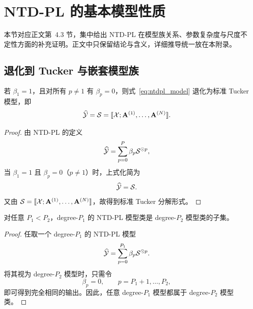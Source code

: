 \appendix


\section{NTD-PL 的基本模型性质}
\label{app:model_properties}

本节对应正文第~4.3 节，集中给出 NTD-PL 在模型族关系、参数复杂度与尺度不定性方面的补充证明。正文中只保留结论与含义，详细推导统一放在本附录。

\subsection{退化到 Tucker 与嵌套模型族}

\begin{proposition}
\label{prop:tucker_special_case_app}
若 $\beta_1=1$，且对所有 $p\neq 1$ 有 $\beta_p=0$，则式~\eqref{eq:ntdpl_model} 退化为标准 Tucker 模型，即
\begin{equation}
\widehat{\mathcal{Y}}
=
\mathcal{S}
=
\llbracket \mathcal{X};\mathbf A^{(1)},\dots,\mathbf A^{(N)}\rrbracket.
\end{equation}
\end{proposition}

\begin{proof}
由 NTD-PL 的定义
\begin{equation}
\widehat{\mathcal{Y}}
=
\sum_{p=0}^{P}\beta_p \mathcal{S}^{\odot p},
\end{equation}
当 $\beta_1=1$ 且 $\beta_p=0$（$p\neq 1$）时，上式化简为
\begin{equation}
\widehat{\mathcal{Y}}
=
\mathcal{S}.
\end{equation}
又由 $\mathcal{S}=\llbracket \mathcal{X};\mathbf A^{(1)},\dots,\mathbf A^{(N)}\rrbracket$，故得到标准 Tucker 分解形式。
\end{proof}

\begin{proposition}[次数嵌套性]
\label{prop:nested_model_family_app}
对任意 $P_1<P_2$，degree-$P_1$ 的 NTD-PL 模型类是 degree-$P_2$ 模型类的子集。
\end{proposition}

\begin{proof}
任取一个 degree-$P_1$ 的 NTD-PL 模型
\begin{equation}
\widehat{\mathcal{Y}}
=
\sum_{p=0}^{P_1}\beta_p \mathcal{S}^{\odot p}.
\end{equation}
将其视为 degree-$P_2$ 模型时，只需令
\begin{equation}
\beta_p=0,\qquad p=P_1+1,\dots,P_2,
\end{equation}
即可得到完全相同的输出。因此，任意 degree-$P_1$ 模型都属于 degree-$P_2$ 模型类。
\end{proof}

